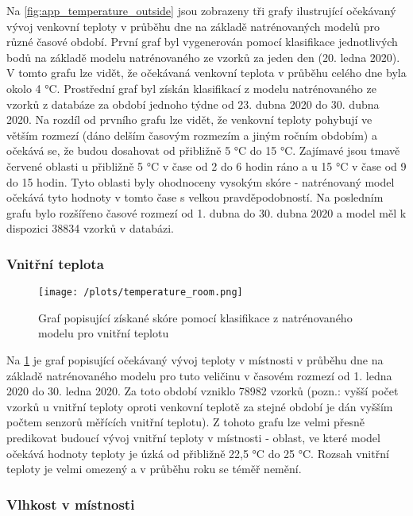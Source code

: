 Na \cref{fig:app_temperature_outside} jsou zobrazeny tři grafy ilustrující očekávaný vývoj venkovní teploty v průběhu dne na základě natrénovaných modelů pro různé časové období. První graf byl vygenerován pomocí klasifikace jednotlivých bodů na základě modelu natrénovaného ze vzorků za jeden den (20. ledna 2020). V tomto grafu lze vidět, že očekávaná venkovní teplota v průběhu celého dne byla okolo 4 \si{\degree}C. Prostřední graf byl získán klasifikací z modelu natrénovaného ze vzorků z databáze za období jednoho týdne od 23. dubna 2020 do 30. dubna 2020. Na rozdíl od prvního grafu lze vidět, že venkovní teploty pohybují ve větším rozmezí (dáno delším časovým rozmezím a jiným ročním obdobím) a očekává se, že budou dosahovat od přibližně 5 \si{\degree}C do 15  \si{\degree}C. Zajímavé jsou tmavě červené oblasti u přibližně 5  \si{\degree}C v čase od 2 do 6 hodin ráno a u 15  \si{\degree}C v čase od 9 do 15 hodin. Tyto oblasti byly ohodnoceny vysokým skóre - natrénovaný model očekává tyto hodnoty v tomto čase s velkou pravděpodobností. Na posledním grafu bylo rozšířeno časové rozmezí od 1. dubna do 30. dubna 2020 a model měl k dispozici 38834 vzorků v databázi. 

\subsubsection*{Vnitřní teplota}

\begin{figure}[H]
  \centering
  \texttt{[image: /plots/temperature\_room.png]}
  \caption{Graf popisující získané skóre pomocí klasifikace z natrénovaného modelu pro vnitřní teplotu}
  \label{fig:app_temperature_room}
\end{figure}

Na \cref{fig:app_temperature_room} je graf popisující očekávaný vývoj teploty v místnosti v průběhu dne na základě natrénovaného modelu pro tuto veličinu v časovém rozmezí od 1. ledna 2020 do 30. ledna 2020. Za toto období vzniklo 78982 vzorků (pozn.: vyšší počet vzorků u vnitřní teploty oproti venkovní teplotě za stejné období je dán vyšším počtem senzorů měřících vnitřní teplotu). Z tohoto grafu lze velmi přesně predikovat budoucí vývoj vnitřní teploty v místnosti - oblast, ve které model očekává hodnoty teploty je úzká od přibližně 22,5 \si{\degree}C do 25 \si{\degree}C. Rozsah vnitřní teploty je velmi omezený a v průběhu roku se téměř nemění. 

\subsubsection*{Vlhkost v místnosti}

